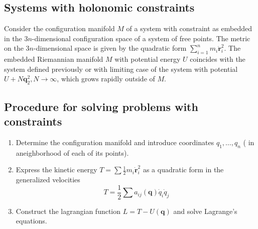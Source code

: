 \documentclass[conference]{IEEEtran}
\theoremstyle{definition}
\theoremstyle{remark}
\begin{document}
    \subsection{Systems with holonomic constraints}
    Consider the configuration manifold $M$ of a system with constraint as embedded in the $3n$-dimensional configuration space of a system of free points. The metric on the $3n$-dimensional space is given by the quadratic form $\sum_{i = 1}^n m_i \dot{\mathbf{r}}_i^2$. The embedded Riemannian manifold $M$ with potential energy $U$ coincides with the system defined previously or with limiting case of the system with potential $U + N \mathbf{q}_2^2, N \to \infty$, which grows rapidly outside of $M$.

    \subsection{Procedure for solving problems with constraints}
    \begin{enumerate}
        \item Determine the configuration manifold and introduce coordinates $q_1, \dots, q_n$ ( in aneighborhood of each of its points).
        \item Express the kinetic energy $T = \sum \frac12 m_i \dot{\mathbf{r}}_i^2$ as a quadratic form in the generalized velocities
        \begin{equation*}
            T = \frac12 \sum a_{ij}(\mathbf{q}) \dot{q}_i \dot{q}_j
        \end{equation*}
        \item Construct the lagrangian function $L = T - U(\mathbf{q})$ and solve Lagrange's equations.
    \end{enumerate}
\end{document}
